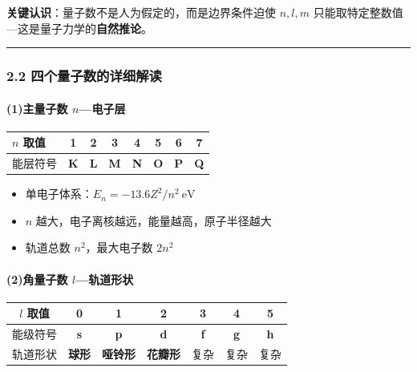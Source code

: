 \textbf{关键认识}：量子数不是人为假定的，而是边界条件迫使 \(n,l,m\) 只能取特定整数值---这是量子力学的\textbf{自然推论}。

\begin{center}\rule{0.5\linewidth}{0.5pt}\end{center}

\subsubsection{2.2 四个量子数的详细解读}\label{ux56dbux4e2aux91cfux5b50ux6570ux7684ux8be6ux7ec6ux89e3ux8bfb}

\paragraph{\texorpdfstring{(1)主量子数 \(n\)---电子层}{(1)主量子数 n---电子层}}\label{ux4e3bux91cfux5b50ux6570-nux7535ux5b50ux5c42}

{\def\LTcaptype{none} %
\begin{longtable}[]{@{}lccccccc@{}}
\toprule\noalign{}
\(n\) 取值 & 1 & 2 & 3 & 4 & 5 & 6 & 7 \\
\midrule\noalign{}
\endhead
\bottomrule\noalign{}
\endlastfoot
能层符号 & \textbf{K} & \textbf{L} & \textbf{M} & \textbf{N} & \textbf{O} & \textbf{P} & \textbf{Q} \\
\end{longtable}
}

\begin{itemize}
\tightlist
\item
  单电子体系：\(E_n = -13.6 Z^2/n^2\ \mathrm{eV}\)
\item
  \(n\) 越大，电子离核越远，能量越高，原子半径越大
\item
  轨道总数 \(n^2\)，最大电子数 \(2n^2\)
\end{itemize}

\paragraph{\texorpdfstring{(2)角量子数 \(l\)---轨道形状}{(2)角量子数 l---轨道形状}}\label{ux89d2ux91cfux5b50ux6570-lux8f68ux9053ux5f62ux72b6}

{\def\LTcaptype{none} %
\begin{longtable}[]{@{}ccccccc@{}}
\toprule\noalign{}
\(l\) 取值 & 0 & 1 & 2 & 3 & 4 & 5 \\
\midrule\noalign{}
\endhead
\bottomrule\noalign{}
\endlastfoot
能级符号 & \textbf{s} & \textbf{p} & \textbf{d} & \textbf{f} & \textbf{g} & \textbf{h} \\
轨道形状 & \textbf{球形} & \textbf{哑铃形} & \textbf{花瓣形} & 复杂 & 复杂 & 复杂 \\
\end{longtable}
}

